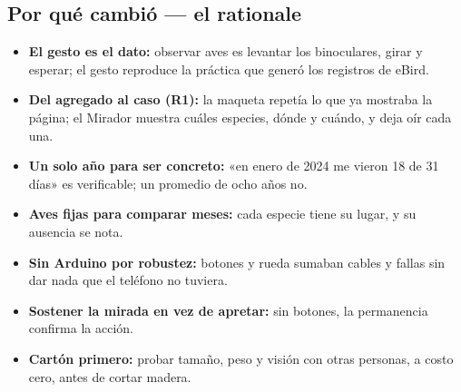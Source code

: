 \documentclass[11pt,a4paper]{article}
\begin{document}
\subsection*{Por qué cambió --- el rationale}
\begin{itemize}
\item \textbf{El gesto es el dato:} observar aves es levantar los binoculares, girar y esperar; el gesto reproduce la práctica que generó los registros de eBird.
\item \textbf{Del agregado al caso (R1):} la maqueta repetía lo que ya mostraba la página; el Mirador muestra cuáles especies, dónde y cuándo, y deja oír cada una.
\item \textbf{Un solo año para ser concreto:} «en enero de 2024 me vieron 18 de 31 días» es verificable; un promedio de ocho años no.
\item \textbf{Aves fijas para comparar meses:} cada especie tiene su lugar, y su ausencia se nota.
\item \textbf{Sin Arduino por robustez:} botones y rueda sumaban cables y fallas sin dar nada que el teléfono no tuviera.
\item \textbf{Sostener la mirada en vez de apretar:} sin botones, la permanencia confirma la acción.
\item \textbf{Cartón primero:} probar tamaño, peso y visión con otras personas, a costo cero, antes de cortar madera.
\end{itemize}
\end{document}
